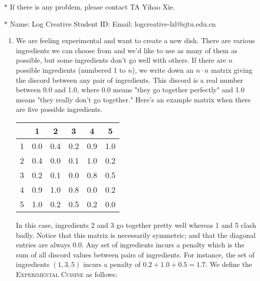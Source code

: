 \documentclass[12pt,a4paper]{article}
\theoremstyle{definition}
\begin{document}
\noindent

\noindent{}
\begin{center}
\footnotesize{\color{red}$*$ If there is any problem, please contact TA Yihao Xie. }

\footnotesize{\color{blue}$*$ Name: Log Creative \quad Student ID:  \quad Email: logcreative-lzl@sjtu.edu.cn}
\end{center}

\begin{enumerate}
    \item We are feeling experimental and want to create a new dish. There are various ingredients we can choose from and we'd like to use as many of them as possible, but some ingredients don't go well with others. If there are $n$ possible ingredients (numbered 1 to $n$), we write down an $n\cdot n$ matrix giving the discord between any pair of ingredients. This discord is a real number between 0.0 and 1.0, where 0.0 means "they go together perfectly" and 1.0 means "they really don't go together." Here's an example matrix when there are five possible ingredients.
    \begin{center}
        \begin{tabular}{|c|ccccc|}
        \hline
             & 1  & 2 & 3 & 4 & 5\\
        \hline
            1 & 0.0 & 0.4 & 0.2 & 0.9 & 1.0\\
            2 & 0.4 & 0.0 & 0.1 & 1.0 & 0.2\\
            3 & 0.2 & 0.1 & 0.0 & 0.8 & 0.5\\
            4 & 0.9 & 1.0 & 0.8 & 0.0 & 0.2\\
            5 & 1.0 & 0.2 & 0.5 & 0.2 & 0.0\\
        \hline
        \end{tabular}
    \end{center}
    In this case, ingredients 2 and 3 go together pretty well whereas 1 and 5 clash badly. Notice that this matrix is necessarily symmetric; and that the diagonal entries are always 0.0. Any set of ingredients incurs a penalty which is the sum of all discord values between pairs of ingredients. For instance, the set of ingredients $(1,3,5)$ incurs a penalty of $0.2+1.0+0.5 = 1.7$. We define the \textsc{Experimental Cuisine} as follows:


\end{enumerate}
\end{document}
